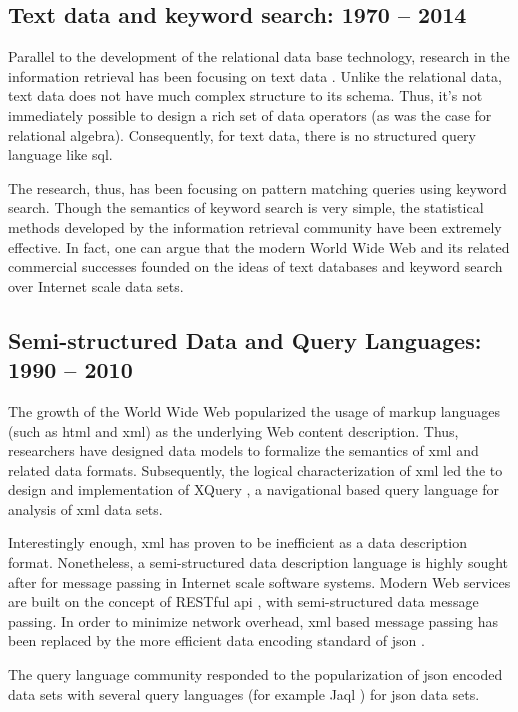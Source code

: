 	\subsection{Text data and keyword search:  1970 -- 2014}
		Parallel to the development of the relational data base technology, research in the information retrieval has been focusing on text data \cite{salton-88, jones-72}.  Unlike the relational data, text data does not have much complex structure to its schema.  Thus, it's not immediately possible to design a rich set of data operators (as was the case for relational algebra).  Consequently, for text data, there is no structured query language like \gls{sql}.
		
		The research, thus, has been focusing on pattern matching queries using keyword search.  Though the semantics of keyword search is very simple, the statistical methods developed by the information retrieval community \cite{salton-88, robertson-09, dumais-88} have been extremely effective.  In fact, one can argue that the modern World Wide Web and its related commercial successes founded on the ideas of text databases and keyword search over Internet scale data sets.
		
	\subsection{Semi-structured Data and Query Languages:  1990 -- 2010}
		The growth of the World Wide Web popularized the usage of markup languages (such as \gls{html} and \gls{xml}) as the underlying Web content description.  Thus, researchers have designed data models \cite{suciu-98} to formalize the semantics of \gls{xml} and related data formats.  Subsequently, the logical characterization of \gls{xml} led the to design and implementation of XQuery \cite{xquery-10}, a navigational based query language for analysis of \gls{xml} data sets.
		
		Interestingly enough, \gls{xml} has proven to be inefficient as a data description format.  Nonetheless, a semi-structured data description language is highly sought after for message passing in Internet scale software systems.  Modern Web services are built on the concept of RESTful \gls{api} \cite{restful-11}, with semi-structured data message passing.  In order to minimize network overhead, \gls{xml} based message passing has been replaced by the more efficient data encoding standard of \gls{json} \cite{json}.
		
		The query language community responded to the popularization of \gls{json} encoded data sets with several query languages \cite{simeon-13} (for example Jaql \cite{ibm-jaql}) for \gls{json} data sets.
	
